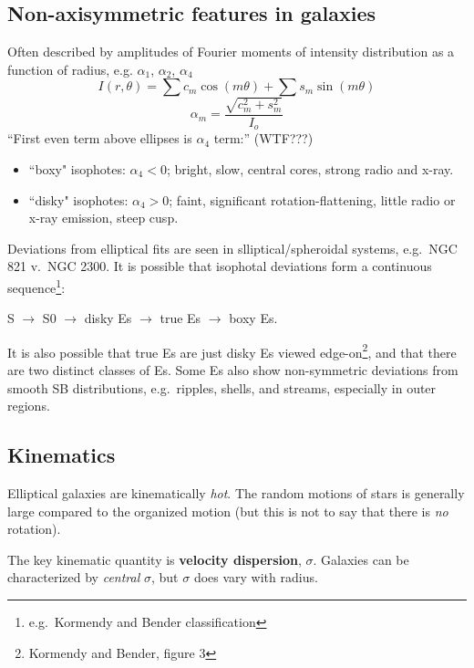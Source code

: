 \documentclass{article}
\newcommand{\mynotes}[1]{\textcolor{cadmiumgreen}{#1}}
\begin{document}
\subsection{Non-axisymmetric features in galaxies}
Often described by amplitudes of Fourier moments of
intensity distribution as a function of radius, e.g.
$\alpha_1$, $\alpha_2$, $\alpha_4$
\[
    I\left(r,\theta\right) = \sum{c_{m}\cos\left(m\theta\right)} +
    \sum{s_{m}\sin\left(m\theta\right)}
\]\[
    \alpha_{m} = \frac{\sqrt{c^{2}_{m} + s_{m}^{2}}}{I_{o}}
\]
``First even term above ellipses is $\alpha_4$ term:'' \mynotes{(WTF???)}
\begin{itemize}
    \item ``boxy" isophotes: $\alpha_4 < 0$;
        bright, slow, central cores, strong radio and x-ray.
    \item ``disky" isophotes: $\alpha_4 > 0$;
        faint, significant rotation-flattening, little
        radio or x-ray emission, steep cusp.
\end{itemize}
Deviations from elliptical fits are seen in slliptical/spheroidal systems,
e.g.\ NGC 821 v.\ NGC 2300. It is possible that isophotal deviations form
a continuous sequence\footnote{e.g.\ Kormendy and Bender classification}:
\begin{center}
S $\rightarrow$ S0 $\rightarrow$ disky Es $\rightarrow$ true Es $\rightarrow$ boxy Es.
\end{center}
It is also possible that true Es are just disky Es viewed
edge-on\footnote{Kormendy and Bender, figure 3}, and that there are two
distinct classes of Es. Some Es also show non-symmetric deviations from
smooth SB distributions, e.g.\ ripples, shells, and streams, especially
in outer regions.

\subsection{Kinematics}
Elliptical galaxies are kinematically \emph{hot}. The random motions of stars
is generally large compared to the organized motion (but this is not to say
that there is \emph{no} rotation).

The key kinematic quantity is \textbf{velocity dispersion}, $\sigma$.  Galaxies
can be characterized by \emph{central} $\sigma$, but $\sigma$ does vary with
radius.
\end{document}
